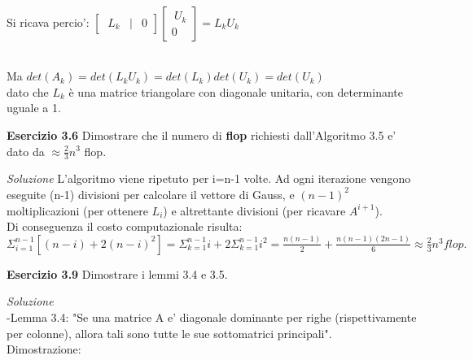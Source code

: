 \documentclass[20pt,a4paper]{book}
\begin{document}
\begin{mah}
\\Si ricava percio': \begin{math}
\begin{bmatrix}\ L_{k} & | & 0 \end{bmatrix} \begin{bmatrix}\ U_{k} \\ 0 \end{bmatrix}=L_{k}U_{k}  \end{math}

\\ Ma \begin{math} det(A_{k})=det(L_{k}U_{k})=det(L_{k})det(U_{k})=det(U_{k})  \end{math}
\\ dato che \begin{math} L_{k} \end{math} è una matrice triangolare con diagonale unitaria, con determinante uguale a 1.

\vspace{10mm}


\textbf{\Large{Esercizio 3.6}}
Dimostrare che il numero di \textbf{flop} richiesti dall'Algoritmo 3.5 e' dato da \begin{math}\approx\frac{2}{3}n^{3}\end{math} flop.


\textit{Soluzione}
L'algoritmo viene ripetuto per i=n-1 volte. Ad ogni iterazione vengono eseguite (n-1) divisioni per calcolare il vettore di Gauss, e \begin{math}(n-1)^{2}\end{math} moltiplicazioni (per ottenere \begin{math}L_{i}\end{math}) e altrettante divisioni (per ricavare \begin{math}A^{i+1}\end{math}).
\\ Di conseguenza il costo computazionale risulta:
\begin{math}\Sigma_{i=1}^{n-1}[(n-i)+2(n-i)^{2}]=\Sigma_{k=1}^{n-1}i+2\Sigma_{k=1}^{n-1}i^{2}=\frac{n(n-1)}{2}+\frac{n(n-1)(2n-1)}{6}\approx\frac{2}{3}n^{3}flop. \end{math}


\vspace{10mm}

\textbf{\Large{Esercizio 3.9}}   
Dimostrare i lemmi 3.4 e 3.5.

\textit{Soluzione}
\\-Lemma 3.4: "Se una matrice A e' diagonale dominante per righe (rispettivamente
per colonne), allora tali sono tutte le sue sottomatrici principali".
\\Dimostrazione:


\end{mah}
\end{document}
